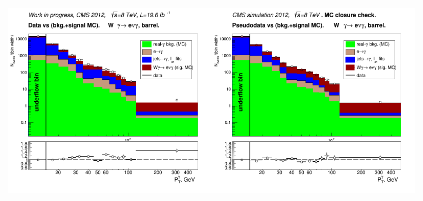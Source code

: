 \begin{figure}[htb]
  \begin{center}
   \includegraphics[width=0.48\textwidth]{../figs/figs_v11/ELECTRON_WGamma/PrepareYields/c_DATAvsBkgPlusSigMCc_ELECTRON_WGamma_TEMPL_CHISO_UNblind__Barrel__phoEt.png}\includegraphics[width=0.48\textwidth]{../figs/figs_v11/ELECTRON_WGamma/PrepareYields/c_DATAvsBkgPlusSigMCc_ELECTRON_WGamma_TEMPL_CHISO_UNblind_MCclosure__Barrel__phoEt_MCclosure.png}\\

\end{center}
\end{figure}

